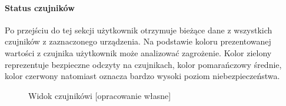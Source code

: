 \documentclass[polish,bachelor,a4paper,oneside]{ppfcmthesis}
\begin{document}
    \paragraph{Status czujników}
    Po przejściu do tej sekcji użytkownik otrzymuje bieżące dane z wszystkich czujników z zaznaczonego urządzenia. Na podstawie koloru prezentowanej wartości z czujnika użytkownik może analizować zagrożenie. Kolor zielony reprezentuje bezpieczne odczyty na czujnikach, kolor pomarańczowy średnie, kolor czerwony natomiast oznacza bardzo wysoki poziom niebezpieczeństwa.
    \nopagebreak
    \begin{figure}[H]
        \centering
        \hfill
        \hfill
        \caption{Widok czujnikówi [opracowanie własne] }
        \label{fig:czujniki}
    \end{figure}
\end{document}
